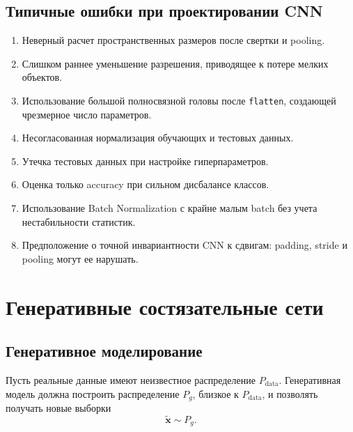 \documentclass[12pt,a4paper]{article}
\numberwithin{equation}{section}
\theoremstyle{definition}
\theoremstyle{remark}
\begin{document}
\subsection{Типичные ошибки при проектировании CNN}

\begin{enumerate}
    \item Неверный расчет пространственных размеров после свертки и
    pooling.

    \item Слишком раннее уменьшение разрешения, приводящее к потере
    мелких объектов.

    \item Использование большой полносвязной головы после
    \texttt{flatten}, создающей чрезмерное число параметров.

    \item Несогласованная нормализация обучающих и тестовых данных.

    \item Утечка тестовых данных при настройке гиперпараметров.

    \item Оценка только accuracy при сильном дисбалансе классов.

    \item Использование Batch Normalization с крайне малым batch без
    учета нестабильности статистик.

    \item Предположение о точной инвариантности CNN к сдвигам:
    padding, stride и pooling могут ее нарушать.
\end{enumerate}

\section{Генеративные состязательные сети}

\subsection{Генеративное моделирование}

Пусть реальные данные имеют неизвестное распределение
\(P_{\mathrm{data}}\). Генеративная модель должна построить
распределение \(P_g\), близкое к \(P_{\mathrm{data}}\), и позволять
получать новые выборки
\[
    \widetilde{\bm{x}}\sim P_g.
\]
\end{document}
